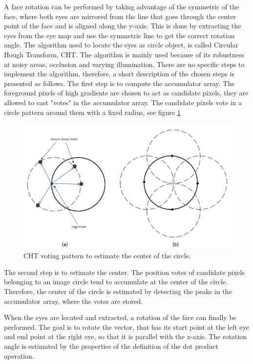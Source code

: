 A face rotation can be performed by taking advantage of the symmetric of the face, where both eyes are mirrored from the line that goes through the center point of the face and is aligned along the y-axis. This is done by extracting the eyes from the eye map and use the symmetric line to get the correct rotation angle.
\newline
The algorithm used to locate the eyes as circle object, is called Circular Hough Transform, CHT. The algorithm is mainly used because of its robustness at noisy areas, occlusion and varying illumination. There are no specific steps to implement the algorithm, therefore, a short description of the chosen steps is presented as follows.
\newline
\newline
The first step is to compute the accumulator array. The foreground pixels of high gradients are chosen to act as candidate pixels, they are allowed to cast "votes" in the accumulator array. The candidate pixels vote in a circle pattern around them with a fixed radius, see figure \ref{fig:CHT}
\newline
\begin{figure}[H]
\centering

\includegraphics[scale=0.4]{accarray.png}

\caption{CHT voting pattern to estimate the center of the circle.}
\label{fig:CHT}
\end{figure}
\indent 
The second step is to estimate the center. The position votes of candidate pixels belonging to an image circle tend to accumulate at the center of the circle. Therefore, the center of the circle is estimated by detecting the peaks in the accumulator array, where the votes are stored.

When the eyes are located and extracted, a rotation of the face can finally be performed.  The goal is to rotate the vector, that has its start point at the left eye and end point at the right eye, so that it is parallel with the x-axis. The rotation angle is estimated by the properties of the definition of the dot product operation.